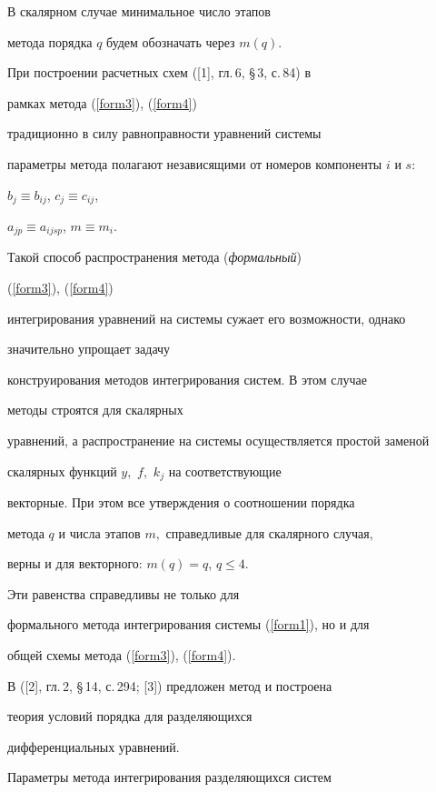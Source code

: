 В скалярном случае минимальное число этапов


метода порядка $q$ будем обозначать через $m(q)$.





При построении расчетных схем ([1], гл.\,6, \S\,3, с.\,84) в 


рамках метода (\ref{form3}), (\ref{form4})


традиционно в силу равноправности уравнений системы


параметры метода полагают независящими от номеров компоненты $i$ и $s$:


$b_{j}\equiv b_{ij}$, $c_{j}\equiv c_{ij}$,


$a_{jp}\equiv a_{ijsp}$, $m\equiv m_{i}$.





Такой способ распространения метода ({\it формальный})


(\ref{form3}), (\ref{form4})


интегрирования уравнений на системы сужает его возможности, однако


значительно упрощает задачу


конструирования методов интегрирования систем. В этом случае


методы строятся для скалярных


уравнений, а распространение на системы осуществляется простой заменой


скалярных функций $y,$ $f,$ $k_j$ на соответствующие


векторные. При этом все утверждения о соотношении порядка 


метода $q$ и числа этапов $m,$ справедливые для скалярного случая,


верны и для векторного: $m(q)=q$, $q\leq4$.


Эти равенства справедливы не только для


формального метода интегрирования системы (\ref{form1}), но и для


общей схемы метода (\ref{form3}), (\ref{form4}).





В ([2], гл.\,2, \S\,14, с.\,294; [3]) предложен метод и построена 


теория условий порядка для разделяющихся


дифференциальных уравнений.


Параметры метода интегрирования разделяющихся систем


